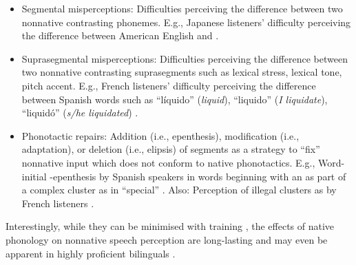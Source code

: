 \begin{itemize}
\item Segmental misperceptions: Difficulties perceiving the difference between two nonnative contrasting phonemes. E.g., Japanese listeners' difficulty perceiving the difference between American English  and  \cite{goto1971, miyawaki1975}.
\item Suprasegmental misperceptions: Difficulties perceiving the difference between two nonnative contrasting suprasegments such as lexical stress, lexical tone, pitch accent. E.g., French listeners' difficulty perceiving the difference between Spanish words such as ``líquido''  (\textit{liquid}), ``liquido''  (\textit{I liquidate}), ``liquidó''  (\textit{s/he liquidated}) \cite{dupoux1997, dupoux2008}.
\item Phonotactic repairs: Addition (i.e., epenthesis), modification (i.e., adaptation), or deletion (i.e., elipsis) of segments as a strategy to ``fix'' nonnative input which does not conform to native phonotactics. E.g., Word-initial -epenthesis by Spanish speakers in words beginning with an  as part of a complex cluster as in ``special'' \cite{halle2014}. Also: Perception of illegal  clusters as  by French listeners \cite{halle2007}.  
\end{itemize}

Interestingly, while they can be minimised with training \cite{logan1991, lively1993, wang2004, iverson2005, ylinen2010, wong2012}, the effects of native phonology on nonnative speech perception are long-lasting \cite{takagi1995, dupoux2008} and may even be apparent in highly proficient bilinguals \cite{dupoux2010}.


